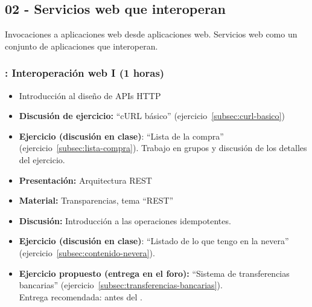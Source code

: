 \documentclass[a4paper,12pt]{article}
\begin{document}
%
%

\subsection{02 - Servicios web que interoperan}

Invocaciones a aplicaciones web desde aplicaciones web. Servicios web como un conjunto de aplicaciones que interoperan.

\subsubsection{\martesF: Interoperación web I (1 horas)}
\label{cal:martesF}

\begin{itemize}
\item Introducción al diseño de APIs HTTP
\item \textbf{Discusión de ejercicio:} ``cURL básico'' (ejercicio~\ref{subsec:curl-basico})
\item \textbf{Ejercicio (discusión en clase)}: ``Lista de la compra'' (ejercicio~\ref{subsec:lista-compra}).
  Trabajo en grupos y discusión de los detalles del ejercicio.
\item \textbf{Presentación:} Arquitectura REST
\item \textbf{Material:} Transparencias, tema ``REST''
\item \textbf{Discusión:} Introducción a las operaciones idempotentes.\item \textbf{Ejercicio (discusión en clase)}: ``Listado de lo que tengo en la nevera'' (ejercicio~\ref{subsec:contenido-nevera}).
\item \textbf{Ejercicio propuesto (entrega en el foro):} ``Sistema de transferencias bancarias'' (ejercicio~\ref{subsec:transferencias-bancarias}). \\
  Entrega recomendada: antes del \martesG.
\end{itemize}
\end{document}
